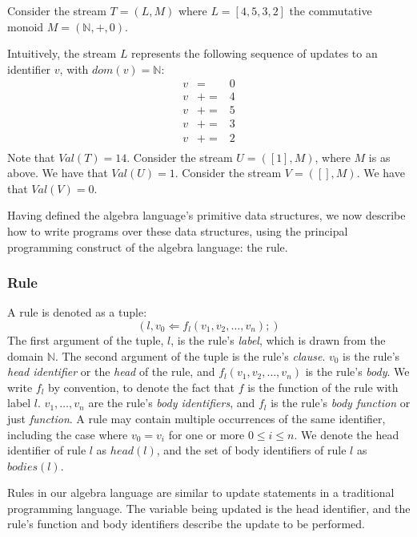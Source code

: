 \begin{example}
Consider the stream $T = (L,M)$ where $L = [4, 5, 3, 2]$ the commutative monoid $M = (\mathbb{N}, +, 0)$.

Intuitively, the stream $L$ represents the following sequence of updates to an identifier $v$, with $dom(v) = \mathbb{N}$:
\begin{eqnarray*}
v &=& 0\\
v &+=& 4\\
v &+=& 5\\
v &+=& 3\\
v &+=& 2\\
\end{eqnarray*}
Note that $Val(T) = 14$.  Consider the stream $U = ([1], M)$, where $M$ is as above.  We have that $Val(U) = 1$.  Consider the stream $V = ([], M)$.  We have that $Val(V) = 0$.
\end{example}

Having defined the algebra language's primitive data structures, we now describe how to write programs over these data structures, using the principal programming construct of the algebra language: the rule.

\subsubsection{Rule}

A rule is denoted as a tuple: $$(l, v_0 \Leftarrow f_l(v_1, v_2, \dots, v_n);)$$  The first argument of the tuple, $l$, is the rule's {\em label}, which is drawn from the domain $\mathbb{N}$.  The second argument of the tuple is the rule's {\em clause}. $v_0$ is the rule's {\em head identifier} or the {\em head} of the rule, and $f_l(v_1, v_2, \dots, v_n)$ is the rule's {\em body}.  We write $f_l$ by convention, to denote the fact that $f$ is the function of the rule with label $l$.  $v_1, \dots, v_n$ are the rule's {\em body identifiers}, and $f_l$ is the rule's {\em body function} or just {\em function}.  A rule may contain multiple occurrences of the same identifier, including the case where $v_0 = v_i$ for one or more $0 \leq i \leq n$.  We denote the head identifier of rule $l$ as $head(l)$, and the set of body identifiers of rule $l$ as $bodies(l)$.

Rules in our algebra language are similar to update statements in a traditional programming language.  The variable being updated is the head identifier, and the rule's function and body identifiers describe the update to be performed.

